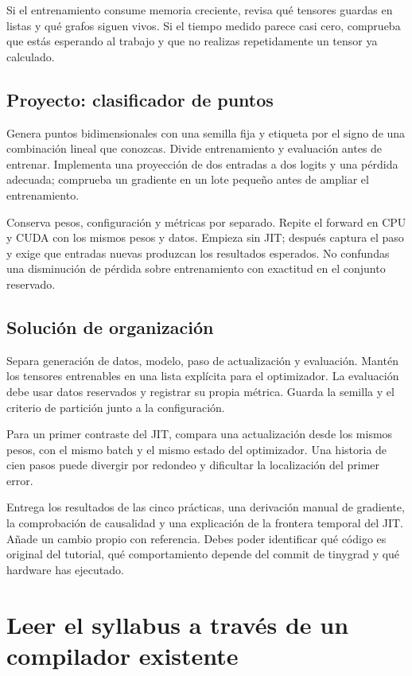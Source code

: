 \documentclass[12pt,a4paper,oneside]{report}
\begin{document}
Si el entrenamiento consume memoria creciente, revisa qué tensores guardas en listas y qué grafos siguen vivos. Si el tiempo medido parece casi cero, comprueba que estás esperando al trabajo y que no realizas repetidamente un tensor ya calculado.

\section{Proyecto: clasificador de puntos}
Genera puntos bidimensionales con una semilla fija y etiqueta por el signo de una combinación lineal que conozcas. Divide entrenamiento y evaluación antes de entrenar. Implementa una proyección de dos entradas a dos logits y una pérdida adecuada; comprueba un gradiente en un lote pequeño antes de ampliar el entrenamiento.

Conserva pesos, configuración y métricas por separado. Repite el forward en CPU y CUDA con los mismos pesos y datos. Empieza sin JIT; después captura el paso y exige que entradas nuevas produzcan los resultados esperados. No confundas una disminución de pérdida sobre entrenamiento con exactitud en el conjunto reservado.

\section{Solución de organización}
Separa generación de datos, modelo, paso de actualización y evaluación. Mantén los tensores entrenables en una lista explícita para el optimizador. La evaluación debe usar datos reservados y registrar su propia métrica. Guarda la semilla y el criterio de partición junto a la configuración.

Para un primer contraste del JIT, compara una actualización desde los mismos pesos, con el mismo batch y el mismo estado del optimizador. Una historia de cien pasos puede divergir por redondeo y dificultar la localización del primer error.

\begin{comprueba}
Entrega los resultados de las cinco prácticas, una derivación manual de gradiente, la comprobación de causalidad y una explicación de la frontera temporal del JIT. Añade un cambio propio con referencia. Debes poder identificar qué código es original del tutorial, qué comportamiento depende del commit de tinygrad y qué hardware has ejecutado.

\end{comprueba}
\chapter{Leer el syllabus a través de un compilador existente}
\label{tiny:syllabus}
\end{document}
